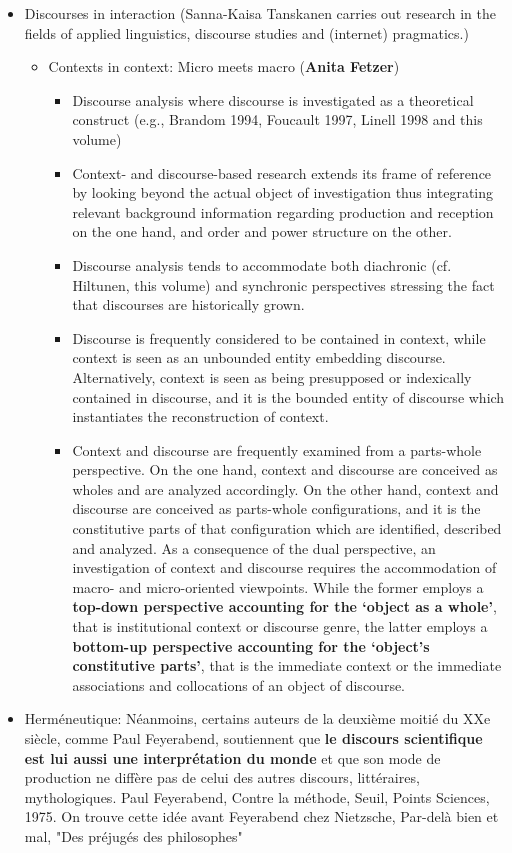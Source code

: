 \documentclass{article}
\begin{document}
\begin{itemize}
\begin{itemize}
				\end{itemize}
			\item Discourses in interaction {\color{gray}(Sanna-Kaisa Tanskanen carries out research in the fields of applied linguistics, discourse studies and (internet) pragmatics.)}
				\begin{itemize}
					\item Contexts in context: Micro meets macro ({\bf \color{purple}Anita Fetzer})
						\begin{itemize}
							\item Discourse analysis where discourse is investigated as a theoretical construct (e.g., Brandom 1994, Foucault 1997, Linell 1998 and this volume)
							\item Context- and discourse-based research extends its frame of reference by looking beyond the actual object of investigation thus {\color{purple}integrating relevant background information} regarding {\color{purple}production} and {\color{purple}reception} on the one hand, and {\color{purple}order and power structure} on the other.
							\item Discourse analysis tends to accommodate both diachronic (cf. Hiltunen, this volume) and synchronic perspectives stressing the fact that discourses are historically grown. 
							\item Discourse is frequently considered to be contained in context, while context is seen as an unbounded entity embedding discourse. Alternatively, context is seen as being presupposed or indexically contained in discourse, and it is the bounded entity of discourse which instantiates the reconstruction of context. 
							\item Context and discourse are frequently examined from a parts-whole perspective. On the one hand, context and discourse are conceived as wholes and are analyzed accordingly. On the other hand, context and discourse are conceived as parts-whole configurations, and it is the constitutive parts of that configuration which are identified, described and analyzed. As a consequence of the {\color{purple}dual perspective, an investigation of context and discourse requires the accommodation of macro- and micro-oriented viewpoints}. While the former employs a {\bf top-down perspective accounting for the ‘object as a whole’}, that is institutional context or discourse genre, the latter employs a {\bf bottom-up perspective accounting for the ‘object’s constitutive parts’}, that is the immediate context or the immediate associations and collocations of an object of discourse.
						\end{itemize}
				\end{itemize}
		\item Herméneutique: Néanmoins, certains auteurs de la deuxième moitié du XXe siècle, comme Paul Feyerabend, soutiennent que {\color{purple} \bf le discours scientifique est lui aussi une interprétation du monde} et que {\color{purple}son mode de production ne diffère pas de celui des autres discours}, littéraires, mythologiques. Paul Feyerabend, Contre la méthode, Seuil, Points Sciences, 1975. On trouve cette idée avant Feyerabend chez Nietzsche, Par-delà bien et mal, "Des préjugés des philosophes"
\end{itemize}
\newpage
\end{document}
